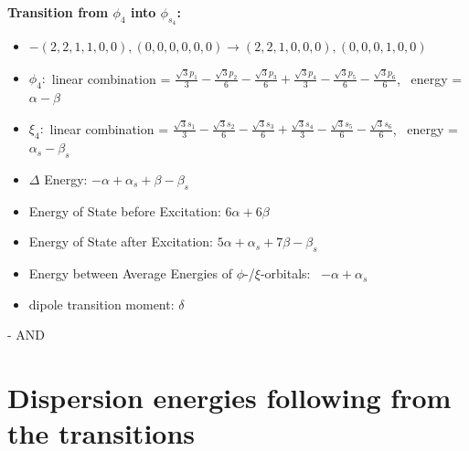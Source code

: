 \documentclass[12pt,a4paper]{article}
\begin{document}
        \noindent\textbf{Transition from $\phi_{4}$ into $\phi_{s_{4}}$:}
        \begin{itemize}
            \item $- (2, 2, 1, 1, 0, 0), (0, 0, 0, 0, 0, 0) \rightarrow (2, 2, 1, 0, 0, 0), (0, 0, 0, 1, 0, 0)$
        
            \item $\phi_{4}:$ linear combination = $\frac{\sqrt{3} p_{1}}{3} - \frac{\sqrt{3} p_{2}}{6} - \frac{\sqrt{3} p_{3}}{6} + \frac{\sqrt{3} p_{4}}{3} - \frac{\sqrt{3} p_{5}}{6} - \frac{\sqrt{3} p_{6}}{6}$, \
            energy = $\alpha - \beta$
            
            \item $\xi_{4}:$ linear combination = $\frac{\sqrt{3} s_{1}}{3} - \frac{\sqrt{3} s_{2}}{6} - \frac{\sqrt{3} s_{3}}{6} + \frac{\sqrt{3} s_{4}}{3} - \frac{\sqrt{3} s_{5}}{6} - \frac{\sqrt{3} s_{6}}{6}$, \
            energy = $\alpha_{s} - \beta_{s}$
            
            \item $\Delta$ Energy: $- \alpha + \alpha_{s} + \beta - \beta_{s}$
            \item Energy of State before Excitation: $6 \alpha + 6 \beta$
            \item Energy of State after Excitation: $5 \alpha + \alpha_{s} + 7 \beta - \beta_{s}$
            \item Energy between Average Energies of $\phi$-/$\xi$-orbitals: \
            $- \alpha + \alpha_{s}$
        
            \item dipole transition moment: $\delta$
        
        \end{itemize}
        
 -  AND 
\newpage \section*{Dispersion energies following from the transitions}
\end{document}
